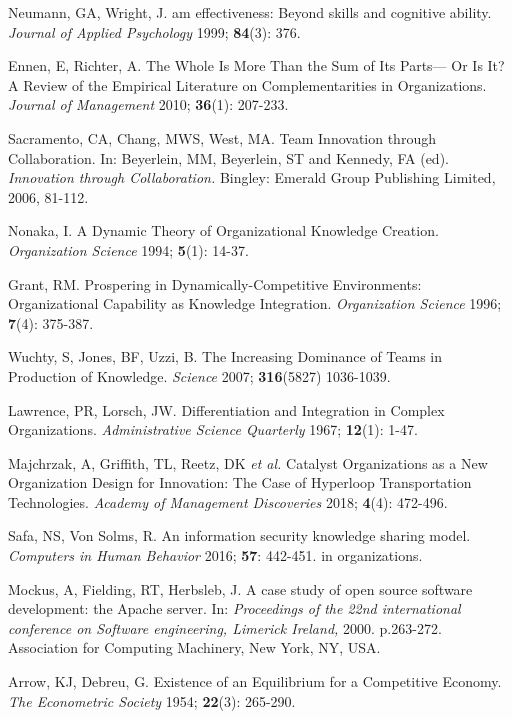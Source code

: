 \documentclass[unnumsec,webpdf,contemporary,large]{oup-authoring-template}%
\theoremstyle{thmstyleone}%
\theoremstyle{thmstyletwo}%
\theoremstyle{thmstylethree}%
\begin{document}
\begin{thebibliography}{10}
Neumann, GA, Wright, J. am effectiveness: Beyond skills and cognitive ability. {\em Journal of Applied Psychology} 1999; {\bf 84}(3): 376.

Ennen, E, Richter, A. The Whole Is More Than the Sum of Its Parts— Or Is It? A Review of the Empirical Literature on Complementarities in Organizations. {\em Journal of Management} 2010; {\bf 36}(1): 207-233.

Sacramento, CA, Chang, MWS, West, MA. Team Innovation through Collaboration. In: Beyerlein, MM, Beyerlein, ST and Kennedy, FA (ed). {\em Innovation through Collaboration.} Bingley: Emerald Group Publishing Limited, 2006, 81-112.

Nonaka, I. A Dynamic Theory of Organizational Knowledge Creation. {\em Organization Science} 1994; {\bf 5}(1): 14-37.

Grant, RM. Prospering in Dynamically-Competitive Environments: Organizational Capability as Knowledge Integration. {\em Organization Science} 1996; {\bf 7}(4): 375-387.

Wuchty, S, Jones, BF, Uzzi, B. The Increasing Dominance of Teams in Production of Knowledge. {\em Science} 2007; {\bf 316}(5827) 1036-1039.

Lawrence, PR, Lorsch, JW. Differentiation and Integration in Complex Organizations. {\em Administrative Science Quarterly} 1967; {\bf 12}(1): 1-47.

Majchrzak, A, Griffith, TL, Reetz, DK {\em et al.} Catalyst Organizations as a New Organization Design for Innovation: The Case of Hyperloop Transportation Technologies. {\em Academy of Management Discoveries} 2018; {\bf 4}(4): 472-496.

Safa, NS, Von Solms, R. An information security knowledge sharing model. {\em Computers in Human Behavior} 2016; {\bf 57}: 442-451.
in organizations.

Mockus, A, Fielding, RT, Herbsleb, J. A case study of open source software development: the Apache server. In: {\em Proceedings of the 22nd international conference on Software engineering, Limerick Ireland,} 2000. p.263-272. Association for Computing Machinery, New York, NY, USA.

Arrow, KJ, Debreu, G. Existence of an Equilibrium for a Competitive Economy. {\em The Econometric Society} 1954; {\bf 22}(3): 265-290.


\end{thebibliography}
\end{document}
